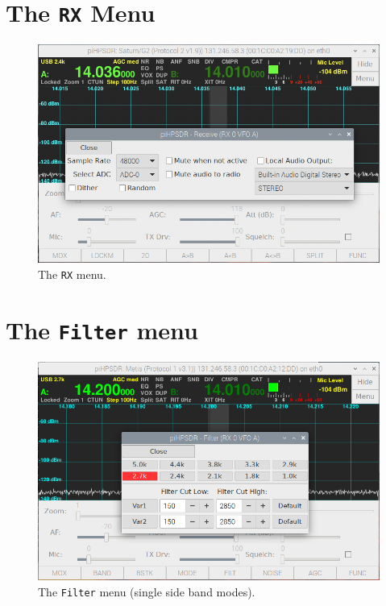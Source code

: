 \documentclass[12pt]{book}
\def\bltt#1{\texttt{\color{blue}#1}}
\begin{document}
\section{The \texttt{RX} Menu}
\begin{figure}[h]
\center
\includegraphics[width=12cm]{RXMenu.png}
\caption{The \bltt{RX} menu.}
\label{fig:RXMenu}
\end{figure}

\section{The \texttt{Filter} menu}
\begin{figure}[h]
\center
\includegraphics[width=12cm]{FilterMenuUSB.png}
\caption{The \bltt{Filter} menu (single side band modes).}
\label{fig:FilterMenuUSB}
\end{figure}
\end{document}

